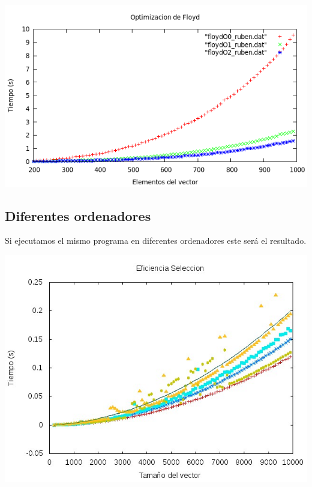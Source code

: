 \documentclass[11pt,spanish]{article} %
\begin{document}
\begin{center}
\includegraphics[scale=0.55]{../Graficas/Floyd/floyd_optimizacion.png}
\end{center}

\subsection{Diferentes ordenadores}
Si ejecutamos el mismo programa en diferentes ordenadores este será el resultado.

\begin{center}
\includegraphics[scale=0.55]{../Graficas/Seleccion/total_Seleccion.jpeg}
\end{center}
\end{document}
